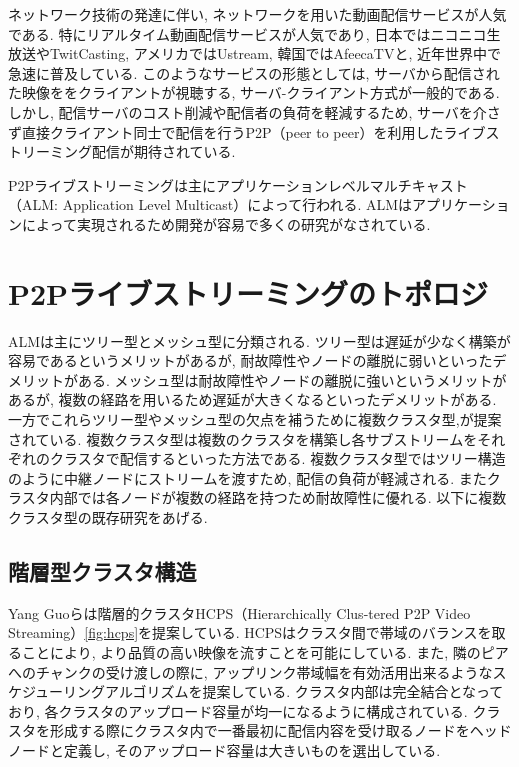 ネットワーク技術の発達に伴い, ネットワークを用いた動画配信サービスが人気である. 特にリアルタイム動画配信サービスが人気であり, 日本ではニコニコ生放送\cite{nico}やTwitCasting\cite{twi}, アメリカではUstream\cite{ust}, 韓国ではAfeecaTV\cite{afr}と, 近年世界中で急速に普及している.  このようなサービスの形態としては, サーバから配信された映像ををクライアントが視聴する, サーバ-クライアント方式が一般的である. しかし, 配信サーバのコスト削減や配信者の負荷を軽減するため, サーバを介さず直接クライアント同士で配信を行うP2P（peer to peer）を利用したライブストリーミング配信が期待されている.

P2Pライブストリーミングは主にアプリケーションレベルマルチキャスト（ALM: Application Level Multicast）によって行われる. ALMはアプリケーションによって実現されるため開発が容易で多くの研究がなされている.


\section{P2Pライブストリーミングのトポロジ}
ALMは主にツリー型とメッシュ型に分類される. ツリー型は遅延が少なく構築が容易であるというメリットがあるが, 耐故障性やノードの離脱に弱いといったデメリットがある. メッシュ型は耐故障性やノードの離脱に強いというメリットがあるが, 複数の経路を用いるため遅延が大きくなるといったデメリットがある. 一方でこれらツリー型やメッシュ型の欠点を補うために複数クラスタ型\cite{dis},\cite{streamline}が提案されている. 複数クラスタ型は複数のクラスタを構築し各サブストリームをそれぞれのクラスタで配信するといった方法である. 複数クラスタ型ではツリー構造のように中継ノードにストリームを渡すため, 配信の負荷が軽減される. またクラスタ内部では各ノードが複数の経路を持つため耐故障性に優れる. 以下に複数クラスタ型の既存研究をあげる.

\newpage

\subsection{階層型クラスタ構造}
Yang Guoらは階層的クラスタHCPS（Hierarchically Clus-tered P2P Video Streaming）\cite{hcps}\ref{fig:hcps}を提案している. HCPSはクラスタ間で帯域のバランスを取ることにより, より品質の高い映像を流すことを可能にしている. また, 隣のピアへのチャンクの受け渡しの際に, アップリンク帯域幅を有効活用出来るようなスケジューリングアルゴリズムを提案している. クラスタ内部は完全結合となっており, 各クラスタのアップロード容量が均一になるように構成されている. クラスタを形成する際にクラスタ内で一番最初に配信内容を受け取るノードをヘッドノードと定義し, そのアップロード容量は大きいものを選出している.

